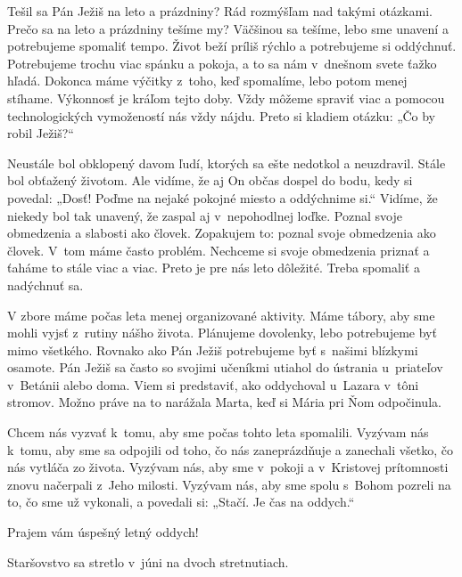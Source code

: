 


Tešil sa Pán Ježiš na leto a prázdniny? Rád rozmýšľam nad takými otázkami. Prečo sa na leto a prázdniny tešíme my? Väčšinou sa tešíme, lebo sme unavení a potrebujeme spomaliť tempo. Život beží príliš rýchlo a potrebujeme si oddýchnuť. Potrebujeme trochu viac spánku a pokoja, a to sa nám v~dnešnom svete ťažko hľadá. Dokonca máme výčitky z~toho, keď spomalíme, lebo potom menej stíhame. Výkonnosť je kráľom tejto doby. Vždy môžeme spraviť viac a pomocou technologických vymožeností nás vždy nájdu. Preto si kladiem otázku: „Čo by robil Ježiš?“

Neustále bol obklopený davom ľudí, ktorých sa ešte nedotkol a neuzdravil. Stále bol obťažený životom. Ale vidíme, že aj On občas dospel do bodu, kedy si povedal: „Dosť! Poďme na nejaké pokojné miesto a oddýchnime si.“ Vidíme, že niekedy bol tak unavený, že zaspal aj v~nepohodlnej loďke. Poznal svoje obmedzenia a slabosti ako človek. Zopakujem to: poznal svoje obmedzenia ako človek. V~tom máme často problém. Nechceme si svoje obmedzenia priznať a ťaháme to stále viac a viac. Preto je pre nás leto dôležité. Treba spomaliť a nadýchnuť sa.

V zbore máme počas leta menej organizované aktivity. Máme tábory, aby sme mohli vyjsť z~rutiny nášho života. Plánujeme dovolenky, lebo potrebujeme byť mimo všetkého. Rovnako ako Pán Ježiš potrebujeme byť s~našimi blízkymi osamote. Pán Ježiš sa často so svojimi učeníkmi utiahol do ústrania u~priateľov v~Betánii alebo doma. Viem si predstaviť, ako oddychoval u~Lazara v~tôni stromov. Možno práve na to narážala Marta, keď si Mária pri Ňom odpočinula.

Chcem nás vyzvať k~tomu, aby sme počas tohto leta spomalili. Vyzývam nás k~tomu, aby sme sa odpojili od toho, čo nás zaneprázdňuje a zanechali všetko, čo nás vytláča zo života. Vyzývam nás, aby sme v~pokoji a v~Kristovej prítomnosti znovu načerpali z~Jeho milosti. Vyzývam nás, aby sme spolu s~Bohom pozreli na to, čo sme už vykonali, a povedali si: „Stačí. Je čas na oddych.“

Prajem vám úspešný letný oddych!



Staršovstvo sa stretlo v~júni na dvoch stretnutiach.

